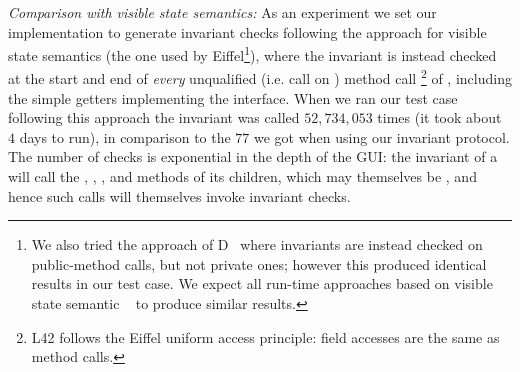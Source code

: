 \textit{Comparison with visible state semantics:}
As an experiment we set our implementation to generate invariant checks following the approach for visible state semantics (the one used by Eiffel\footnote{We also tried the approach of D~\cite{Alexandrescu:2010:DPL:1875434,DRef} where invariants are instead checked on public-method calls, but not private ones; however this produced identical results in our test case.
We expect all run-time approaches based on visible state semantic ~\cite{feldman2006jose,fahndrich2010embedded,abercrombie2002jcontractor,tran2003design}
to produce similar results.
}), where the invariant is instead checked at the start and end of \emph{every} unqualified (i.e. call on \Q@this@) method call%
\footnote{L42 follows the Eiffel uniform access principle: field accesses are the same as method calls.}
of \Q@SafeMovable@, including the simple getters implementing the \Q@Widget@ interface. When we ran our test case following this approach the invariant was called $52,734,053$ times (it took about $4$ days to run), in comparison to the $77$ we got when using our invariant protocol. The number of checks is exponential in the depth of the GUI: the invariant of a \Q@SafeMovable@ will call the \Q@width@, \Q@height@, \Q@left@, and \Q@top@ methods of its children, which may themselves be \Q@SafeMovable@s, and hence such calls will themselves invoke invariant checks. %



